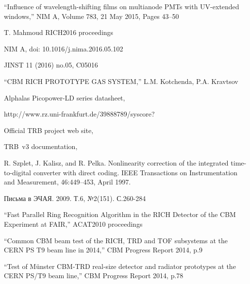\begin{thebibliography}{99}

``Influence of wavelength-shifting films on multianode PMTs with UV-extended windows,''
NIM A, Volume 783, 21 May 2015, Pages 43–50

T. Mahmoud RICH2016 proceedings

NIM A, doi: 10.1016/j.nima.2016.05.102

JINST 11 (2016) no.05, C05016

``CBM RICH PROTOTYPE GAS SYSTEM,''
L.M. Kotchenda, P.A. Kravtsov

Alphalas Picopower-LD series datasheet,

http://www.rz.uni-frankfurt.de/39888789/syscore?

Official TRB project web site,

TRB~v3 documentation,

R. Szplet, J. Kalisz, and R. Pelka. Nonlinearity correction of the integrated time-to-digital converter with direct coding. IEEE Transactions on Instrumentation and Measurement, 46:449–453, April 1997.

Письма в ЭЧАЯ. 2009. Т.6, №2(151). С.260-284

``Fast Parallel Ring Recognition Algorithm in the RICH Detector of the CBM Experiment at FAIR,''
ACAT2010 proceedings

``Common CBM beam test of the RICH, TRD and TOF subsystems at the CERN PS T9 beam line in 2014,''
CBM Progress Report 2014, p.9

``Test of M\"unster CBM-TRD real-size detector and radiator prototypes at the CERN PS/T9 beam line,''
CBM Progress Report 2014, p.78


\end{thebibliography}
